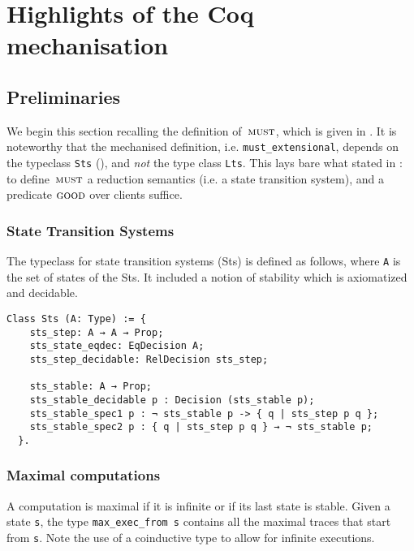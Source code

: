 \section{Highlights of the Coq mechanisation}
\label{sec:coq}

\subsection{Preliminaries}
We begin this section recalling the definition of~$\operatorname{\textsc{must}}$, which is given in
. It is noteworthy that the mechanised definition, i.e.
\lstinline!must_extensional!, depends on the typeclass \lstinline!Sts!
(), and {\em not} the type class \lstinline!Lts!. This lays
bare what stated in : to define~$\operatorname{\textsc{must}}$  a reduction
semantics (i.e. a state transition system), and a predicate $\textsc{good}$ over
clients suffice.

\subsubsection{State Transition Systems}

The typeclass for state transition systems (Sts) is defined as follows, where
\lstinline|A| is the set of states of the Sts. It included a notion of stability
which is axiomatized and decidable.

\begin{mdframed}
\begin{verbatim}
Class Sts (A: Type) := {
    sts_step: A → A → Prop;
    sts_state_eqdec: EqDecision A;
    sts_step_decidable: RelDecision sts_step;

    sts_stable: A → Prop;
    sts_stable_decidable p : Decision (sts_stable p);
    sts_stable_spec1 p : ¬ sts_stable p -> { q | sts_step p q };
    sts_stable_spec2 p : { q | sts_step p q } → ¬ sts_stable p;
  }.
\end{verbatim}
\label{fig:typeclass-sts}
\end{mdframed}

\subsubsection{Maximal computations}

A computation is maximal if it is infinite or if its last state is stable.
%
Given a state \lstinline|s|, the type \lstinline|max_exec_from s| contains all
the maximal traces that start from \lstinline|s|. Note the use of a coinductive
type to allow for infinite executions.

